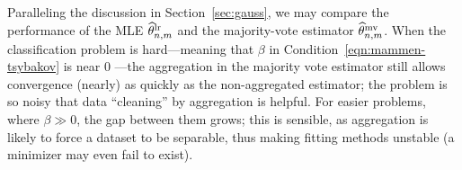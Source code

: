 Paralleling the discussion in Section~\ref{sec:gauss}, we may compare the
performance of the MLE $\widehat{\theta}^{\textup{lr}}_{n,m}$ and
the majority-vote estimator $\widehat{\theta}^{\textup{mv}}_{n,m}$.
%
When the classification problem is hard---meaning that
$\beta$ in Condition~\eqref{eqn:mammen-tsybakov} is near 0%
---the aggregation in the majority vote estimator still allows
convergence (nearly) as quickly as the non-aggregated estimator; the
problem is so noisy that data ``cleaning'' by aggregation is helpful.
For easier problems, where $\beta \gg 0$, the gap between them
grows; this is sensible, as aggregation is likely to
force a dataset to be separable, thus making fitting methods
unstable (a minimizer may even fail to exist). 





